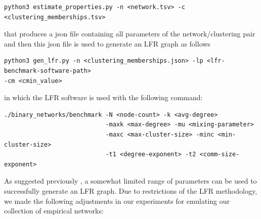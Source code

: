 \documentclass[a4paper]{article}   	%
\begin{document}
\begin{lstlisting}[basicstyle=\ttfamily\small]
python3 estimate_properties.py -n <network.tsv> -c <clustering_memberships.tsv>
\end{lstlisting}
that produces a json file containing all parameters of the network/clustering pair and then this json file is used to generate an LFR graph as follows

\begin{lstlisting}[basicstyle=\ttfamily\small]
python3 gen_lfr.py -n <clustering_memberships.json> -lp <lfr-benchmark-software-path>
-cm <cmin_value>
\end{lstlisting}

\noindent
in which the LFR software \citep{lancichinetti2008benchmark} is used with the following command:

\begin{lstlisting}[basicstyle=\ttfamily\small]
./binary_networks/benchmark -N <node-count> -k <avg-degree>
                            -maxk <max-degree> -mu <mixing-parameter>
                            -maxc <max-cluster-size> -minc <min-cluster-size>
                            -t1 <degree-exponent> -t2 <comm-size-exponent>
\end{lstlisting}



As suggested previously \citep{hagberg2008exploring}, a somewhat limited range of parameters can be used to successfully generate an LFR graph. Due to restrictions of the LFR methodology, we made the following adjustments in our experiments for emulating our collection of empirical networks:
\end{document}

